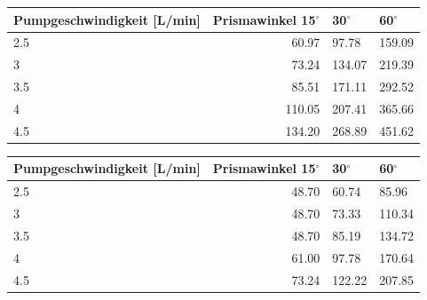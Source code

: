\documentclass[titlepage=firstcover, captions=tableheading]{scrartcl}
\begin{document}
\begin{minipage}{\linewidth}
    \begin{table}[H]
        \centering
    
    \begin{tabular}{lrll}
        \toprule
        Pumpgeschwindigkeit [L/min] & Prismawinkel 15$^{\circ}$ & 30$^{\circ}$ & 60$^{\circ}$ \\
        \midrule
        2.5   & 60.97  & 97.78   & 159.09  \\ 
        3     & 73.24  & 134.07  & 219.39  \\ 
        3.5   & 85.51  & 171.11  & 292.52   \\ 
        4     & 110.05 &  207.41 & 365.66  \\
        4.5   & 134.20 & 268.89  & 451.62  \\    
        \bottomrule
        
    \end{tabular}
    \label{tab:0}
    \end{table}
    \end{minipage}

    \begin{minipage}{\linewidth}
        \begin{table}[H]
            \centering
        
        \begin{tabular}{lrll}
            \toprule
            Pumpgeschwindigkeit [L/min] & Prismawinkel 15$^{\circ}$ & 30$^{\circ}$ & 60$^{\circ}$ \\
            \midrule
            2.5  & 48.70 & 60.74 & 85.96 \\ 
            3    & 48.70 & 73.33 & 110.34 \\ 
            3.5  & 48.70 & 85.19 & 134.72 \\ 
            4    & 61.00 & 97.78 & 170.64 \\
            4.5  & 73.24 & 122.22 & 207.85 \\    
            \bottomrule
            
        \end{tabular}
        \label{tab:5}
        \end{table}
        \end{minipage}
\end{document}
